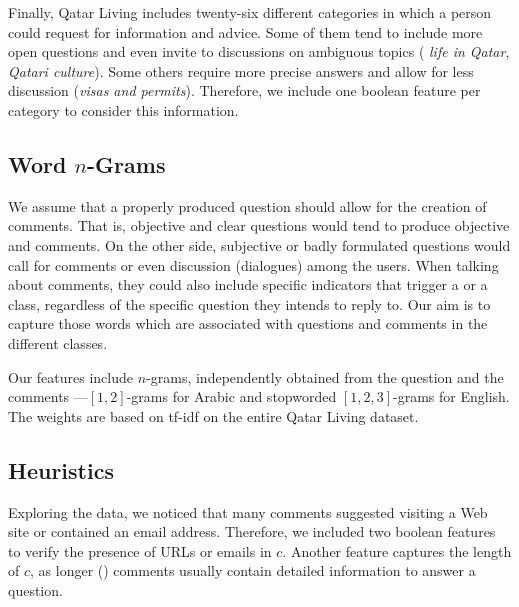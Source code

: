 Finally, Qatar Living includes twenty-six different categories in which a person 
could request for information and advice. Some of them tend to include more 
open questions and even invite to discussions on ambiguous topics (\eg
\textit{life in Qatar}, \textit{Qatari culture}). Some others require more 
precise answers and allow for less discussion (\eg \textit{visas and permits}). 
Therefore, we include one boolean feature per category to consider this 
information. 
 
\subsection{Word $n$-Grams}
\label{ssub:ngrams}

We assume that a properly produced question should allow for the creation of 
\good comments. That is, objective and clear questions would tend to produce 
objective and \good comments. On the other side, subjective or badly formulated 
questions would call for \bad comments or even discussion (\ie dialogues) among 
the users. When talking about comments, they could also include specific 
indicators that trigger a \good or a \bad class, regardless of the specific 
question they intends to reply to. Our aim is to capture those words which 
are associated with questions and comments in the different classes. 

Our features include $n$-grams, independently obtained from the question and the
comments ---$[1,2]$-grams for Arabic and stopworded $[1,2,3]$-grams for English. 
The weights are based on tf-idf on the entire Qatar Living dataset. 

\subsection{Heuristics}
\label{ssub:heuristics}

Exploring the data, we noticed that many \good comments suggested visiting a Web 
site or contained an email address. Therefore, we included two boolean 
features 
to verify the presence of URLs or emails in $c$. Another feature captures the 
length of $c$, as longer (\good) comments usually contain detailed information 
to answer a question. 



